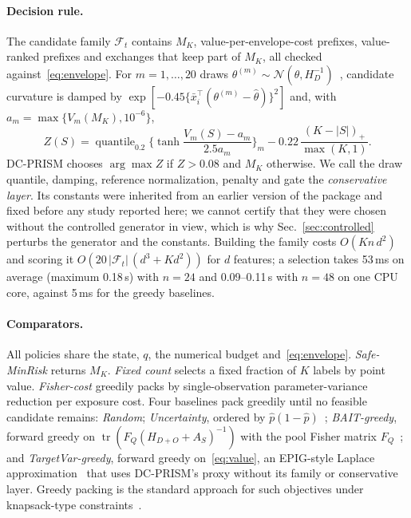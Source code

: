 \documentclass[runningheads]{llncs}
\begin{document}
\paragraph{Decision rule.} The candidate family $\mathcal F_t$ contains $M_K$, value-per-envelope-cost prefixes, value-ranked prefixes and exchanges that keep part of $M_K$, all checked against~\eqref{eq:envelope}. For $m=1,\dots,20$ draws $\theta^{(m)}\sim\mathcal N(\widehat\theta,H_D^{-1})$~\cite{mackay1992practical}, candidate curvature is damped by $\exp[-0.45\{\bar x_i^\top(\theta^{(m)}-\widehat\theta)\}^2]$ and, with $a_m=\max\{V_m(M_K),10^{-6}\}$,
\begin{equation}
 Z(S)=\operatorname{quantile}_{0.2}\Big\{\tanh\frac{V_m(S)-a_m}{2.5a_m}\Big\}_m-0.22\,\frac{(K-|S|)_+}{\max(K,1)} .\label{eq:score}
\end{equation}
DC-PRISM chooses $\arg\max Z$ if $Z>0.08$ and $M_K$ otherwise. We call the draw quantile, damping, reference normalization, penalty and gate the \emph{conservative layer}. Its constants were inherited from an earlier version of the package and fixed before any study reported here; we cannot certify that they were chosen without the controlled generator in view, which is why Sec.~\ref{sec:controlled} perturbs the generator and the constants. Building the family costs $O(Kn\,d^2)$ and scoring it $O(20\,|\mathcal F_t|\,(d^3+Kd^2))$ for $d$ features; a selection takes 53\,ms on average (maximum 0.18\,s) with $n=24$ and 0.09--0.11\,s with $n=48$ on one CPU core, against 5\,ms for the greedy baselines.

\paragraph{Comparators.} All policies share the state, $q$, the numerical budget and~\eqref{eq:envelope}. \emph{Safe-MinRisk} returns $M_K$. \emph{Fixed count} selects a fixed fraction of $K$ labels by point value. \emph{Fisher-cost} greedily packs by single-observation parameter-variance reduction per exposure cost. Four baselines pack greedily until no feasible candidate remains: \emph{Random}; \emph{Uncertainty}, ordered by $\widehat p(1-\widehat p)$~\cite{lewis1994sequential}; \emph{BAIT-greedy}, forward greedy on $\operatorname{tr}(F_Q(H_{D+O}+A_S)^{-1})$ with the pool Fisher matrix $F_Q$~\cite{ash2021fishing}; and \emph{TargetVar-greedy}, forward greedy on~\eqref{eq:value}, an EPIG-style Laplace approximation~\cite{bickfordsmith2023prediction} that uses DC-PRISM's proxy without its family or conservative layer. Greedy packing is the standard approach for such objectives under knapsack-type constraints~\cite{krause2005near,sviridenko2004note}.
\end{document}
